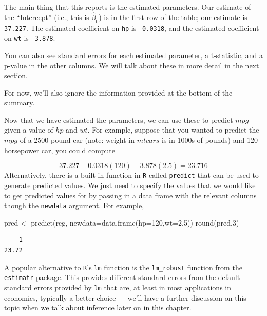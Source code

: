 \documentclass[
  letterpaper,
  DIV=11,
  numbers=noendperiod]{scrreprt}
\newenvironment{Shaded}{\begin{snugshade}}{\end{snugshade}}
\newcommand{\AttributeTok}[1]{\textcolor[rgb]{0.40,0.45,0.13}{#1}}
\newcommand{\DecValTok}[1]{\textcolor[rgb]{0.68,0.00,0.00}{#1}}
\newcommand{\FloatTok}[1]{\textcolor[rgb]{0.68,0.00,0.00}{#1}}
\newcommand{\FunctionTok}[1]{\textcolor[rgb]{0.28,0.35,0.67}{#1}}
\newcommand{\NormalTok}[1]{\textcolor[rgb]{0.00,0.23,0.31}{#1}}
\newcommand{\OtherTok}[1]{\textcolor[rgb]{0.00,0.23,0.31}{#1}}
\begin{document}
The main thing that this reports is the estimated parameters. Our
estimate of the ``Intercept'' (i.e., this is \(\hat{\beta}_0\)) is in
the first row of the table; our estimate is \texttt{37.227}. The
estimated coefficient on \texttt{hp} is \texttt{-0.0318}, and the
estimated coefficient on \texttt{wt} is \texttt{-3.878}.

You can also see standard errors for each estimated parameter, a
t-statistic, and a p-value in the other columns. We will talk about
these in more detail in the next section.

For now, we'll also ignore the information provided at the bottom of the
summary.

Now that we have estimated the parameters, we can use these to predict
\(mpg\) given a value of \(hp\) and \(wt\). For example, suppose that
you wanted to predict the \(mpg\) of a 2500 pound car (note: weight in
\(mtcars\) is in 1000s of pounds) and 120 horsepower car, you could
compute

\[
  37.227 - 0.0318(120) - 3.878(2.5) = 23.716
\] Alternatively, there is a built-in function in \texttt{R} called
\texttt{predict} that can be used to generate predicted values. We just
need to specify the values that we would like to get predicted values
for by passing in a data frame with the relevant columns though the
\texttt{newdata} argument. For example,

\begin{Shaded}
\begin{Highlighting}[]
\NormalTok{pred }\OtherTok{\textless{}{-}} \FunctionTok{predict}\NormalTok{(reg, }\AttributeTok{newdata=}\FunctionTok{data.frame}\NormalTok{(}\AttributeTok{hp=}\DecValTok{120}\NormalTok{,}\AttributeTok{wt=}\FloatTok{2.5}\NormalTok{))}
\FunctionTok{round}\NormalTok{(pred,}\DecValTok{3}\NormalTok{)}
\end{Highlighting}
\end{Shaded}

\begin{verbatim}
    1 
23.72 
\end{verbatim}

A popular alternative to \texttt{R}'s \texttt{lm} function is the
\texttt{lm\_robust} function from the \texttt{estimatr} package. This
provides different standard errors from the default standard errors
provided by \texttt{lm} that are, at least in most applications in
economics, typically a better choice --- we'll have a further discussion
on this topic when we talk about inference later on in this chapter.
\end{document}
